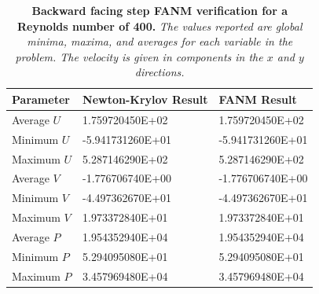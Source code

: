 \begin{table}[h!]
  \begin{center}
    \begin{tabular}{lll}\hline\hline
      \multicolumn{1}{l}{Parameter}& 
      \multicolumn{1}{l}{Newton-Krylov Result}&
      \multicolumn{1}{l}{FANM Result}\\
      \hline
      Average $U$ & 1.759720450E+02 & 1.759720450E+02 \\
      Minimum $U$ & -5.941731260E+01 & -5.941731260E+01 \\
      Maximum $U$ & 5.287146290E+02 & 5.287146290E+02 \\
      \hline
      Average $V$ & -1.776706740E+00 & -1.776706740E+00 \\
      Minimum $V$ & -4.497362670E+01 & -4.497362670E+01 \\
      Maximum $V$ & 1.973372840E+01 & 1.973372840E+01 \\
      \hline
      Average $P$ & 1.954352940E+04 & 1.954352940E+04 \\
      Minimum $P$ & 5.294095080E+01 & 5.294095080E+01 \\
      Maximum $P$ & 3.457969480E+04 & 3.457969480E+04 \\
      \hline\hline
    \end{tabular}
  \end{center}
  \caption{\textbf{Backward facing step FANM verification for a
      Reynolds number of 400.} \textit{The values reported are global
      minima, maxima, and averages for each variable in the
      problem. The velocity is given in components in the $x$ and $y$
      directions.}}
  \label{tab:step_re400_results}
\end{table}

